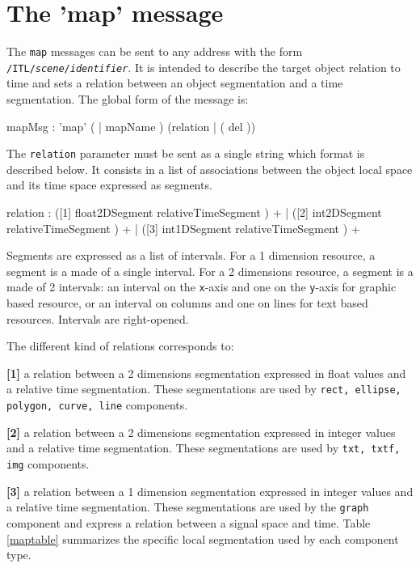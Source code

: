 \documentclass[a4paper,twoside]{report}
\newcommand{\sublevel}[1]	{\section{#1}}
\newcommand{\OSC}[1]		{\texttt{#1}}
\newcommand{\values}[1]		{\texttt{#1}}
\let\olditemize\itemize
\let\oldenditemize\enditemize
\renewenvironment{itemize} 	{\olditemize \setlength{\itemsep}{1mm}}{\oldenditemize}
\begin{document}
\sublevel{The 'map' message}
\label{mapMsg}

The \OSC{map} messages can be sent to any address with the form \OSC{/ITL/\textit{scene}/\textit{identifier}}. It is intended to describe the target object relation to time and sets a relation between an object segmentation and a time segmentation. 
The global form of the message is:

\begin{rail}
mapMsg : 'map' ( | mapName ) (relation	|	( del ))
\end{rail}

The \OSC{relation} parameter must be sent as a single string which format is described below. It consists in a list of associations between the object local space and its time space expressed as segments.

\begin{rail}
relation : 
		([1] float2DSegment relativeTimeSegment ) +
	| 	([2] int2DSegment relativeTimeSegment ) +
	| 	([3] int1DSegment relativeTimeSegment ) + 
\end{rail}

Segments are expressed as a list of intervals. For a 1 dimension resource, a segment is a made of a single interval. For a 2 dimensions resource, a segment is a made of 2 intervals: an interval on the \values{x}-axis and one on the \values{y}-axis for graphic based resource, or an interval on columns and one on lines for text based resources. Intervals are right-opened.

The different kind of relations corresponds to:
\begin{itemize}
\item \textbf{[1]} a relation between a 2 dimensions segmentation expressed in float values and a relative time segmentation. These segmentations are used by \OSC{rect, ellipse, polygon, curve, line} components.
\item \textbf{[2]} a relation between a 2 dimensions segmentation expressed in integer values and a relative time segmentation. These segmentations are used by \OSC{txt, txtf, img} components. 
\item \textbf{[3]} a relation between a 1 dimension segmentation expressed in integer values and a relative time segmentation. These segmentations are used by the \OSC{graph} component and express a relation between a signal space and time.
\end{itemize}
Table \ref{maptable} summarizes the specific local segmentation used by each component type. 
\end{document}
